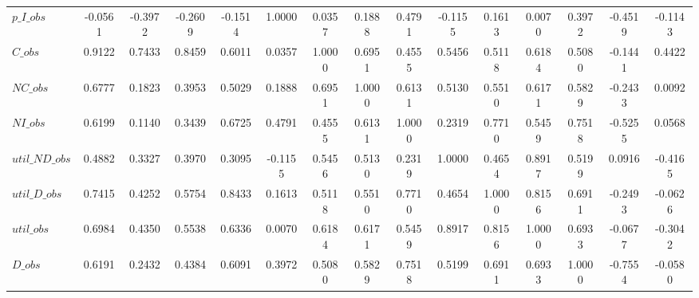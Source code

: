 \begin{center}
\begin{longtable}{lcccccccccccccc}
$p\_I\_obs      $	 & 	          -0.0561	 & 	          -0.3972	 & 	          -0.2609	 & 	          -0.1514	 & 	           1.0000	 & 	           0.0357	 & 	           0.1888	 & 	           0.4791	 & 	          -0.1155	 & 	           0.1613	 & 	           0.0070	 & 	           0.3972	 & 	          -0.4519	 & 	          -0.1143 \\ 
$C\_obs         $	 & 	           0.9122	 & 	           0.7433	 & 	           0.8459	 & 	           0.6011	 & 	           0.0357	 & 	           1.0000	 & 	           0.6951	 & 	           0.4555	 & 	           0.5456	 & 	           0.5118	 & 	           0.6184	 & 	           0.5080	 & 	          -0.1441	 & 	           0.4422 \\ 
$NC\_obs        $	 & 	           0.6777	 & 	           0.1823	 & 	           0.3953	 & 	           0.5029	 & 	           0.1888	 & 	           0.6951	 & 	           1.0000	 & 	           0.6131	 & 	           0.5130	 & 	           0.5510	 & 	           0.6171	 & 	           0.5829	 & 	          -0.2433	 & 	           0.0092 \\ 
$NI\_obs        $	 & 	           0.6199	 & 	           0.1140	 & 	           0.3439	 & 	           0.6725	 & 	           0.4791	 & 	           0.4555	 & 	           0.6131	 & 	           1.0000	 & 	           0.2319	 & 	           0.7710	 & 	           0.5459	 & 	           0.7518	 & 	          -0.5255	 & 	           0.0568 \\ 
$util\_ND\_obs  $	 & 	           0.4882	 & 	           0.3327	 & 	           0.3970	 & 	           0.3095	 & 	          -0.1155	 & 	           0.5456	 & 	           0.5130	 & 	           0.2319	 & 	           1.0000	 & 	           0.4654	 & 	           0.8917	 & 	           0.5199	 & 	           0.0916	 & 	          -0.4165 \\ 
$util\_D\_obs   $	 & 	           0.7415	 & 	           0.4252	 & 	           0.5754	 & 	           0.8433	 & 	           0.1613	 & 	           0.5118	 & 	           0.5510	 & 	           0.7710	 & 	           0.4654	 & 	           1.0000	 & 	           0.8156	 & 	           0.6911	 & 	          -0.2493	 & 	          -0.0626 \\ 
$util\_obs      $	 & 	           0.6984	 & 	           0.4350	 & 	           0.5538	 & 	           0.6336	 & 	           0.0070	 & 	           0.6184	 & 	           0.6171	 & 	           0.5459	 & 	           0.8917	 & 	           0.8156	 & 	           1.0000	 & 	           0.6933	 & 	          -0.0677	 & 	          -0.3042 \\ 
$D\_obs         $	 & 	           0.6191	 & 	           0.2432	 & 	           0.4384	 & 	           0.6091	 & 	           0.3972	 & 	           0.5080	 & 	           0.5829	 & 	           0.7518	 & 	           0.5199	 & 	           0.6911	 & 	           0.6933	 & 	           1.0000	 & 	          -0.7554	 & 	          -0.0580 \\ 

\end{longtable}
\end{center}
